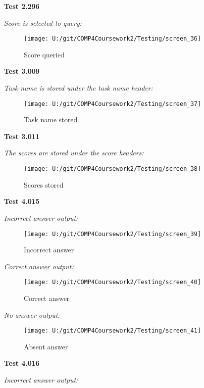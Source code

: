 \textbf{Test 2.296}

\textit{Score is selected to query: }

\begin{figure}[H]
    \label{fig: Second Screen}\caption{Score queried}
    \texttt{[image: U:/git/COMP4Coursework2/Testing/screen\_36]}
\end{figure}

\textbf{Test 3.009}

\textit{Task name is stored under the task name header: }

\begin{figure}[H]
    \label{fig: Second Screen}\caption{Task name stored}
    \texttt{[image: U:/git/COMP4Coursework2/Testing/screen\_37]}
\end{figure}

\textbf{Test 3.011}

\textit{The scores are stored under the score headers: }

\begin{figure}[H]
    \label{fig: Second Screen}\caption{Scores stored}
    \texttt{[image: U:/git/COMP4Coursework2/Testing/screen\_38]}
\end{figure}

\textbf{Test 4.015}

\textit{Incorrect answer output: }

\begin{figure}[H]
    \label{fig: Second Screen}\caption{Incorrect answer}
    \texttt{[image: U:/git/COMP4Coursework2/Testing/screen\_39]}
\end{figure}

\textit{Correct answer output: }

\begin{figure}[H]
    \label{fig: Second Screen}\caption{Correct answer}
    \texttt{[image: U:/git/COMP4Coursework2/Testing/screen\_40]}
\end{figure}

\textit{No answer output: }

\begin{figure}[H]
    \label{fig: Second Screen}\caption{Absent answer}
    \texttt{[image: U:/git/COMP4Coursework2/Testing/screen\_41]}
\end{figure}

\textbf{Test 4.016}

\textit{Incorrect answer output: }

